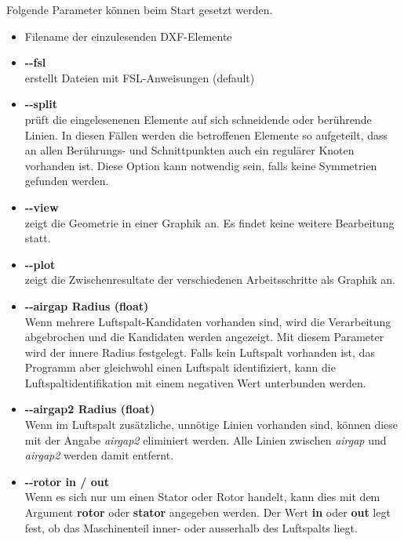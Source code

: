 \documentclass[10pt, a4paper,german]{scrartcl}
\newcommand{\Slanted}[1]{{\normalfont\slshape #1}}
\newcommand{\LongArg}[1]{\mbox{{-}{-}#1}}
\begin{document}
Folgende Parameter können beim Start gesetzt werden.
\begin{itemize}
\item Filename der einzulesenden DXF-Elemente
\item {\bfseries{\LongArg{fsl}}}\\
      erstellt Dateien mit FSL-Anweisungen (default)
                
\item {\bfseries{\LongArg{split}}}\\
		prüft die eingelesenenen Elemente auf sich schneidende oder berührende Linien.
		In diesen Fällen werden die betroffenen Elemente so aufgeteilt,
		dass an allen Berührungs- und Schnittpunkten auch ein regulärer Knoten vorhanden ist. 
       Diese Option kann notwendig sein, falls keine Symmetrien gefunden werden.
		
\item {\bfseries{\LongArg{view}}}\\
		zeigt die Geometrie in einer Graphik an. Es findet keine weitere Bearbeitung statt.
		
\item {\bfseries{\LongArg{plot}}}\\
		zeigt die Zwischenresultate der verschiedenen Arbeitsschritte als Graphik an.
		
\item {\bfseries{\LongArg{airgap} Radius (float)}}\\
		Wenn mehrere Luftspalt-Kandidaten vorhanden sind, wird die Verarbeitung abgebrochen und
		die Kandidaten werden angezeigt. Mit diesem Parameter wird der innere Radius festgelegt.
		Falls kein Luftspalt vorhanden ist, das Programm aber gleichwohl einen Luftspalt
		identifiziert, kann die Luftspaltidentifikation mit einem negativen Wert unterbunden werden.

\item {\bfseries{\LongArg{airgap2} Radius (float)}}\\
		Wenn im Luftspalt zusätzliche, unnötige Linien vorhanden sind, können diese mit der
		Angabe \Slanted{airgap2} eliminiert werden. Alle Linien zwischen \Slanted{airgap} und
		\Slanted{airgap2} werden damit entfernt.

\item {\bfseries{\LongArg{rotor} in / out}}\\
		Wenn es sich nur um einen Stator oder Rotor handelt, kann dies mit dem Argument 
		{\bfseries rotor} oder {\bfseries stator} angegeben werden. Der Wert {\bfseries in}
		oder {\bfseries out} legt fest, ob das Maschinenteil inner- oder ausserhalb des 
		Luftspalts liegt.
		

\end{itemize}
\end{document}
